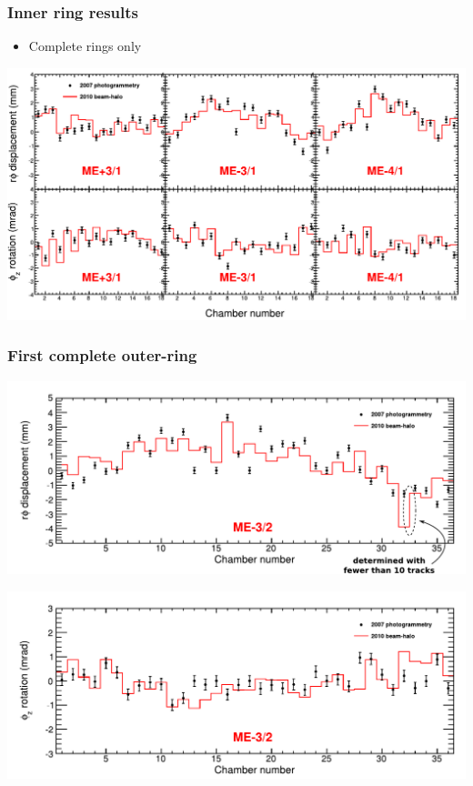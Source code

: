 \documentclass[compress]{beamer}
\begin{document}
\begin{frame}
\frametitle{Inner ring results}

\begin{itemize}
\item Complete rings only
\end{itemize}

\includegraphics[width=\linewidth]{compare_complete.pdf}
\end{frame}

\begin{frame}
\frametitle{First complete outer-ring}
\begin{center}
\includegraphics[width=0.9\linewidth]{compare_mem32_x.pdf}

\includegraphics[width=0.9\linewidth]{compare_mem32_phiz.pdf}
\end{center}
\end{frame}
\end{document}

